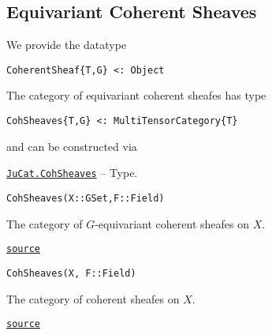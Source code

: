 \documentclass{memoir}
\begin{document}
\hypertarget{17053673031877315927}{}


\subsection{Equivariant Coherent Sheaves}



We provide the datatype




\begin{lstlisting}
CoherentSheaf{T,G} <: Object
\end{lstlisting}



The category of equivariant coherent sheafes has type




\begin{lstlisting}
CohSheaves{T,G} <: MultiTensorCategory{T}
\end{lstlisting}



and can be constructed via


\hypertarget{72414698628682391}{} 
\hyperlink{72414698628682391}{\texttt{JuCat.CohSheaves}}  -- {Type.}

\begin{adjustwidth}{2em}{0pt}


\begin{verbatim}
CohSheaves(X::GSet,F::Field)
\end{verbatim}

The category of \(G\)-equivariant coherent sheafes on \(X\).



\href{https://github.com/FabianMaeurer/JuCat.jl/blob/367390e2d003deec2ababa73caeab405e934bb35/src/structures/ConvolutionCategory/CoherentSheaves.jl#L23-L27}{\texttt{source}}



\begin{verbatim}
CohSheaves(X, F::Field)
\end{verbatim}

The category of coherent sheafes on \(X\).



\href{https://github.com/FabianMaeurer/JuCat.jl/blob/367390e2d003deec2ababa73caeab405e934bb35/src/structures/ConvolutionCategory/CoherentSheaves.jl#L35-L39}{\texttt{source}}


\end{adjustwidth}
\end{document}
